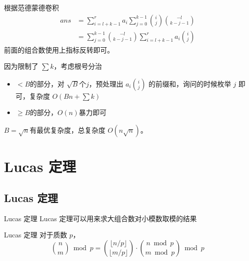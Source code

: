 \documentclass[UTF8]{beamer}
\begin{document}
    \begin{frame}
        
    根据范德蒙德卷积
    $$
    \begin{aligned}
    ans&=\sum_{i=l+k-1}^ra_i\sum_{j=0}^{k-1}\binom{i}{j}\binom{-l}{k-j-1}\\
    &=\sum_{j=0}^{k-1}\binom{-l}{k-j-1}\sum_{i=l+k-1}^{r}a_i\binom{i}{j}
    \end{aligned}
    $$
    前面的组合数使用上指标反转即可。

    \pause
    因为限制了 $\sum k$，考虑根号分治

    \begin{itemize}
        \item 
    $<B$的部分，对 $\sqrt{B}$个$j$，预处理出 $a_i\binom{i}{j}$ 的前缀和，询问的时候枚举 $j$ 即可，复杂度 $O(Bn+\sum k)$

    \item $\ge B$的部分，$O(n)$暴力即可
    \end{itemize}


    $B=\sqrt{n}$有最优复杂度，总复杂度 $O(n\sqrt{n})$。
    \end{frame}

    \section{Lucas 定理}
    \subsection{Lucas 定理}
    \begin{frame}{Lucas 定理}
        Lucas 定理可以用来求大组合数对小模数取模的结果
        \begin{block}{Lucas 定理}
            对于质数 $p$，
            $$
            \binom{n}{m}\bmod p = \binom{\lfloor n/p\rfloor}{\lfloor m/p\rfloor}\cdot\binom{n\bmod p}{m\bmod p}\bmod p
            $$
        \end{block}
    \end{frame}
\end{document}
